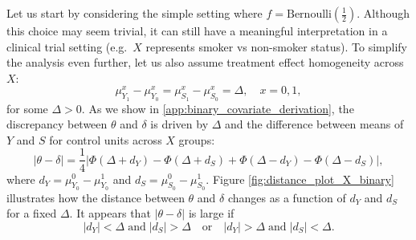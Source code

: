 \documentclass[referee,usenatbib]{biom}
\begin{document}
Let us start by considering the simple setting where \(f = \text{Bernoulli} \left( \frac{1}{2} \right) \). Although this choice may seem trivial, it can still have a meaningful interpretation in a clinical trial setting (e.g.\ \(X\) represents smoker vs non-smoker status). To simplify the analysis even further, let us also assume treatment effect homogeneity across \(X\):
\begin{equation*}
    \mu^{x}_{Y_{1}} - \mu^{x}_{Y_{0}} = \mu^{x}_{S_{1}} - \mu^{x}_{S_{0}} = \Delta, \quad x = 0, 1,
\end{equation*}
for some \(\Delta > 0\). As we show in \ref{app:binary_covariate_derivation}, the discrepancy between \(\theta\) and \(\delta\) is driven by \(\Delta\) and the difference between means of \(Y\) and \(S\) for control units across \(X\) groups:
\begin{equation*}
    |\theta - \delta| = \frac{1}{4} | \Phi(\Delta + d_{Y}) - \Phi(\Delta + d_{S}) + \Phi(\Delta - d_{Y}) - \Phi(\Delta - d_{S}) |,
\end{equation*}
where \(d_{Y} = \mu^{0}_{Y_{0}} - \mu^{1}_{Y_{0}}\) and \(d_{S} = \mu^{0}_{S_{0}} - \mu^{1}_{S_{0}}\). Figure \ref{fig:distance_plot_X_binary} illustrates how the distance between \(\theta\) and \(\delta\) changes as a function of \(d_{Y}\) and \(d_{S}\) for a fixed \(\Delta\). It appears that \(|\theta - \delta|\) is large if
\begin{equation*}
    |d_{Y}| < \Delta \; \text{and} \; |d_{S}| > \Delta \quad \text{or} \quad |d_{Y}| > \Delta \; \text{and} \; |d_{S}| < \Delta.
\end{equation*}
\end{document}
